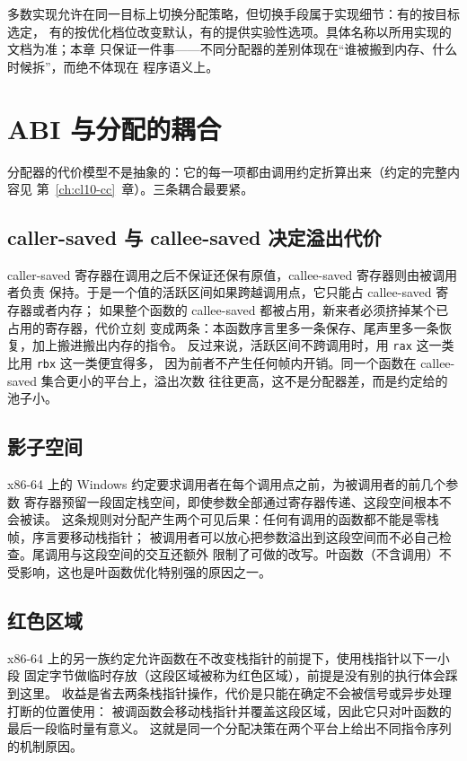 \documentclass[12pt,a4paper,fontset=fandol]{ctexbook}
\newcommand{\Sym}[1]{\texttt{#1}}
\newcommand{\Win}{\textsf{Windows}}
\newcommand{\xSixtyFour}{\textsf{x86-64}}
\begin{document}
多数实现允许在同一目标上切换分配策略，但切换手段属于实现细节：有的按目标选定，
有的按优化档位改变默认，有的提供实验性选项。具体名称以所用实现的文档为准；本章
只保证一件事——不同分配器的差别体现在“谁被搬到内存、什么时候拆”，而绝不体现在
程序语义上。

\section{ABI 与分配的耦合}\label{sec:cl06-abi}

分配器的代价模型不是抽象的：它的每一项都由调用约定折算出来（约定的完整内容见
第~\ref{ch:cl10-cc}~章）。三条耦合最要紧。

\subsection{caller-saved 与 callee-saved 决定溢出代价}\label{sec:cl06-saved}

caller-saved 寄存器在调用之后不保证还保有原值，callee-saved 寄存器则由被调用者负责
保持。于是一个值的活跃区间如果跨越调用点，它只能占 callee-saved 寄存器或者内存；
如果整个函数的 callee-saved 都被占用，新来者必须挤掉某个已占用的寄存器，代价立刻
变成两条：本函数序言里多一条保存、尾声里多一条恢复，加上搬进搬出内存的指令。
反过来说，活跃区间不跨调用时，用 \Sym{rax} 这一类比用 \Sym{rbx} 这一类便宜得多，
因为前者不产生任何帧内开销。同一个函数在 callee-saved 集合更小的平台上，溢出次数
往往更高，这不是分配器差，而是约定给的池子小。

\subsection{影子空间}\label{sec:cl06-shadow}

\xSixtyFour{} 上的 \Win{} 约定要求调用者在每个调用点之前，为被调用者的前几个参数
寄存器预留一段固定栈空间，即使参数全部通过寄存器传递、这段空间根本不会被读。
这条规则对分配产生两个可见后果：任何有调用的函数都不能是零栈帧，序言要移动栈指针；
被调用者可以放心把参数溢出到这段空间而不必自己检查。尾调用与这段空间的交互还额外
限制了可做的改写。叶函数（不含调用）不受影响，这也是叶函数优化特别强的原因之一。

\subsection{红色区域}\label{sec:cl06-redzone}

\xSixtyFour{} 上的另一族约定允许函数在不改变栈指针的前提下，使用栈指针以下一小段
固定字节做临时存放（这段区域被称为红色区域），前提是没有别的执行体会踩到这里。
收益是省去两条栈指针操作，代价是只能在确定不会被信号或异步处理打断的位置使用：
被调函数会移动栈指针并覆盖这段区域，因此它只对叶函数的最后一段临时量有意义。
这就是同一个分配决策在两个平台上给出不同指令序列的机制原因。
\end{document}
